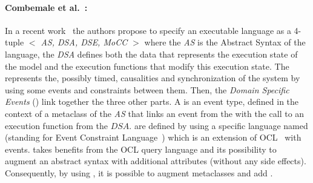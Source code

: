 


\paragraph{Combemale et al.~\cite{sle13-combemale}:}
In a recent work~\cite{sle13-combemale} the authors propose to specify an executable language as a 4-tuple \emph{$<$ AS, DSA, DSE, MoCC $>$} where the \emph{AS} is the Abstract Syntax of the language, the \emph{DSA} defines both the data that represents the execution state of the model and the execution functions that modify this execution state. The \mocc represents the, possibly timed, causalities and synchronization of the system by using some events and constraints between them. Then, the \emph{Domain Specific Events} (\dse) link together the three other parts. A \dse is an event type, defined in the context of a metaclass of the \emph{AS} that links an event from the \mocc with the call to an execution function from the $DSA$. \dse are defined by using a specific language named \ecl (standing for Event Constraint Language~\cite{eclbib}) which is an extension of OCL~\cite{omgocl2bib} with events. \ecl takes benefits from the OCL query language and its possibility to augment an abstract syntax with additional attributes (without any side effects). Consequently, by using \ecl, it is possible to augment \as metaclasses and add \dse. 

